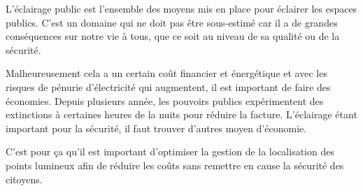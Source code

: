 L'\'eclairage public est l'ensemble des moyens mis en place pour \'eclairer les espaces publics. C'est un domaine qui ne doit pas \^etre sous-estim\'e car il a de grandes cons\'equences sur notre vie \`a tous, que ce soit au niveau de sa qualit\'e ou de la s\'ecurit\'e.\cite{projwebsite}


Malheureusement cela a un certain co\^ut financier et \'energ\'etique et avec les risques de p\'enurie d'\'electricit\'e qui augmentent, il est important de faire des \'economies. Depuis plusieurs ann\'ee, les pouvoirs publics exp\'erimentent des extinctions \`a certaines heures de la nuits pour r\'eduire la facture. L'\'eclairage \'etant important pour la s\'ecurit\'e, il faut trouver d'autres moyen d'\'economie.

C'est pour \c{c}a qu'il est important d'optimiser la gestion de la localisation des points lumineux afin de r\'eduire les co\^uts sans remettre en cause la s\'ecurit\'e des citoyens.